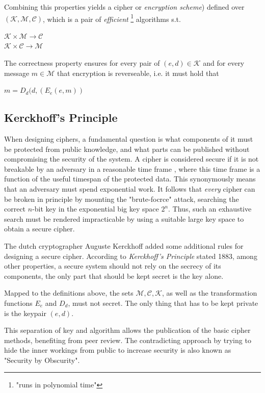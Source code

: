 Combining this properties yields a cipher or \textit{encryption scheme}) defined over $\mathcal{(K,M,C)}$, which is a pair of \textit{efficient}
 \footnote{"runs in polynomial time"} algorithms s.t.
 \begin{center}
   $\mathcal{K} \times \mathcal{M} \rightarrow \mathcal{C}$
   \\
   $\mathcal{K} \times \mathcal{C} \rightarrow \mathcal{M}$
 \end{center}

 The correctness property ensures for every pair of $(e,d) \in \mathcal{K}$ and for every message $m \in \mathcal{M}$ that encryption is reverseable, i.e. 
 it must hold that 
 \begin{center}  
 $ m = D_d(d, (E_e(e, m))$
  \end{center}

\subsection{Kerckhoff's Principle}

When designing ciphers, a fundamental question is what components of it must be protected from public knowledge, and what parts can be published without
compromising the security of the system. A cipher is considered secure if it is not breakable by an adversary in a reasonable time frame \cite{handbook1}, where
this time frame is a function of the useful timespan of the protected data. This synonymously means that an adversary must spend exponential work.
It follows that \textit{every} cipher can be broken in principle by
mounting the "brute-focrce" attack, searching the correct $n$-bit key in the exponential big key space $2^n$. Thus, such an exhaustive search must be rendered impracticable by 
using a suitable large key space to obtain a secure cipher.

The dutch cryptographer Auguste Kerckhoff added some additional rules for designing a secure cipher.
According to \textit{Kerckhoff's Principle} stated 1883, among other properties, a secure system should not rely on the secrecy of
its components, the only part that should be kept secret is the key alone.  

Mapped to the definitions above, the sets $\mathcal{M, C, K}$, as well as the
transformation functions $E_e$ and $D_d$, must not secret. The only thing that has to be kept private is the keypair $(e, d)$.

This separation of key and algorithm allows the publication of the basic cipher methods, benefiting from peer review. The contradicting approach by trying
to hide the inner workings from public to increase security is also known as "Security by Obscurity".
\\

